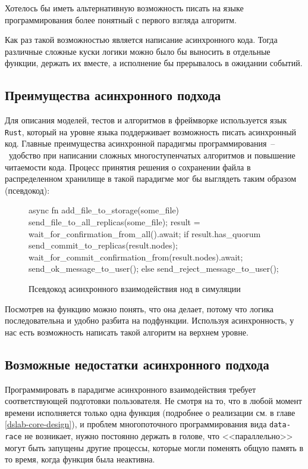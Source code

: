 Хотелось бы иметь альтернативную возможность писать на языке программирования более понятный с первого взгляда алгоритм.

Как раз такой возможностью является написание асинхронного кода. Тогда различные сложные куски логики можно было бы выносить в отдельные функции, держать их вместе, а исполнение бы прерывалось в ожидании событий.


\subsection{Преимущества асинхронного подхода}

Для описания моделей, тестов и алгоритмов в фреймворке используется язык \texttt{Rust}, который на уровне языка поддерживает возможность писать асинхронный код. Главные преимущества асинхронной парадигмы программирования~--~удобство при написании сложных многоступенчатых алгоритмов и повышение читаемости кода. Процесс принятия решения о сохранении файла в распределенном хранилище в такой парадигме мог бы выглядеть таким образом (псевдокод):

\begin{figure}[H]
    \small
\begin{rustcode}
    async fn add_file_to_storage(some_file) {
        send_file_to_all_replicas(some_file);
        result = wait_for_confirmation_from_all().await;
        if result.has_quorum {
            send_commit_to_replicas(result.nodes);
            wait_for_commit_confirmation_from(result.nodes).await;
            send_ok_message_to_user();
        } else {
            send_reject_message_to_user();
        }
    }
\end{rustcode}
\caption{Псевдокод асинхронного взаимодействия нод в симуляции}
\label{pseudocode}
\end{figure}

Посмотрев на функцию можно понять, что она делает, потому что логика последовательна и удобно разбита на подфункции. Используя асинхронность, у нас есть возможность написать такой алгоритм на верхнем уровне. 

\subsection{Возможные недостатки асинхронного подхода}

Программировать в парадигме асинхронного взаимодействия требует соответствующей подготовки пользователя. Не смотря на то, что в любой момент времени исполняется только одна функция (подробнее о реализации см. в главе \ref{dslab-core-design}), и проблем многопоточного программирования вида \texttt{data-race} не возникает, нужно постоянно держать в голове, что <<параллельно>> могут быть запущены другие процессы, которые могли поменять общую память в то время, когда функция была неактивна. 

